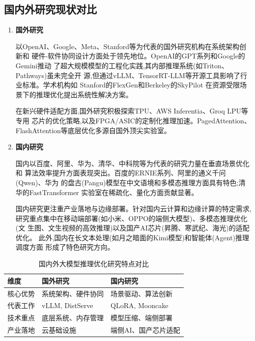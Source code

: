 \subsection{国内外研究现状对比}

\begin{enumerate}

\item \textbf{国外研究}

以OpenAI、Google、Meta、Stanford等为代表的国外研究机构在系统架构创新和
硬件-软件协同设计方面处于领先地位。OpenAI的GPT系列和Google的Gemini推动
了超大规模模型的工程化实践,其内部推理系统(如Triton、Pathways)虽未完全开
源,但通过vLLM、TensorRT-LLM等开源工具影响了行业标准。学术机构如
Stanford的FlexGen\cite{sheng2023flexgen}和Berkeley的SkyPilot\cite{yang2023skypilot}
在资源受限场景下的推理优化提出系统性解决方案。

在新兴硬件适配方面,国外研究积极探索TPU、AWS Inferentia、Groq LPU等专用
芯片的优化策略,以及FPGA/ASIC的定制化推理加速。PagedAttention、
FlashAttention等底层优化多源自国外顶尖实验室。

\item \textbf{国内研究}

国内以百度、阿里、华为、清华、中科院等为代表的研究力量在垂直场景优化和
算法效率提升方面表现突出。百度的ERNIE系列、阿里的通义千问(Qwen)、华为
的盘古(Pangu)模型在中文语境和多模态推理方面具有特色;清华的FastTransformer
实验室在稀疏化、量化方面贡献显著。

国内研究更注重产业落地与边缘部署。针对国内云计算和边缘计算的特定需求,
研究重点集中在移动端部署(如小米、OPPO的端侧大模型)、多模态推理优化(文
生图、文生视频的高效推理)以及国产AI芯片(昇腾、寒武纪、海光)的适配优化。
此外,国内在长文本处理(如月之暗面的Kimi模型)和智能体(Agent)推理调度方面
形成了特色研究方向。

\end{enumerate}

\begin{table}[htbp]
    \caption{国内外大模型推理优化研究特点对比}
    \label{tab:comparison}
    \centering
    \begin{tabular}{p{3cm}p{5cm}p{5cm}}
      \toprule
      \textbf{维度} & \textbf{国外研究} & \textbf{国内研究} \\
      \midrule
      核心优势 & 系统架构、硬件协同 & 场景驱动、算法创新 \\
      代表工作 & vLLM\cite{kwon2023efficient},
        DistServe\cite{zhong2024distserve} &
        QLoRA\cite{dettmers2023qlora}, Mooncake\cite{qin2024mooncake} \\
      技术重点 & 底层系统、内存管理 & 模型压缩、端侧部署 \\
      产业落地 & 云基础设施 & 端侧AI、国产芯片适配 \\
      \bottomrule
    \end{tabular}
\end{table}

